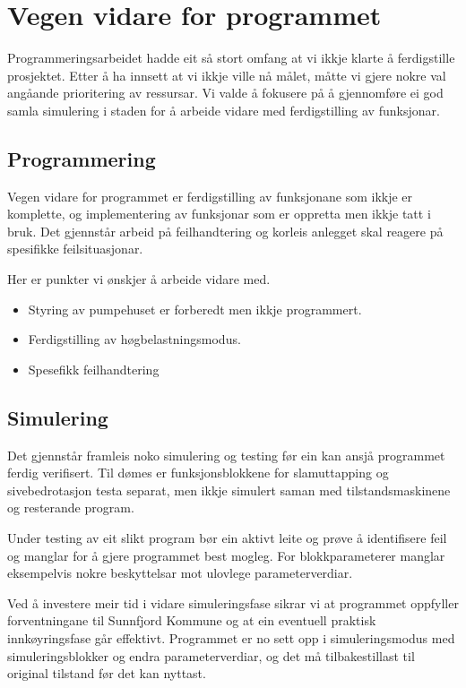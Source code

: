 \section{Vegen vidare for programmet}
\thispagestyle{fancy}

Programmeringsarbeidet hadde eit så stort omfang at vi ikkje klarte å ferdigstille prosjektet.
Etter å ha innsett at vi ikkje ville nå målet, måtte vi gjere nokre val angåande prioritering av ressursar. 
Vi valde å fokusere på å gjennomføre ei god samla simulering i staden for å arbeide vidare med ferdigstilling av funksjonar.

\subsection{Programmering}

Vegen vidare for programmet er ferdigstilling av funksjonane som ikkje er komplette, og 
implementering av funksjonar som er oppretta men ikkje tatt i bruk. 
Det gjennstår arbeid på feilhandtering og korleis anlegget skal reagere på spesifikke feilsituasjonar.

Her er punkter vi ønskjer å arbeide vidare med.

\begin{itemize}
    \item Styring av pumpehuset er forberedt men ikkje programmert. 
    \item Ferdigstilling av høgbelastningsmodus.
    \item Spesefikk feilhandtering
\end{itemize}

\subsection{Simulering}

Det gjennstår framleis noko simulering og testing før ein kan ansjå programmet ferdig verifisert.
Til dømes er funksjonsblokkene for slamuttapping og sivebedrotasjon testa separat, men ikkje simulert saman med
tilstandsmaskinene og resterande program.

Under testing av eit slikt program bør ein aktivt leite og prøve å identifisere feil og manglar for å gjere programmet best mogleg.
For blokkparameterer manglar eksempelvis nokre beskyttelsar mot ulovlege parameterverdiar.

Ved å investere meir tid i vidare simuleringsfase sikrar vi at programmet oppfyller forventningane til \gls{Sunnfjord Kommune} og at ein eventuell
praktisk innkøyringsfase går effektivt. \newline
Programmet er no sett opp i simuleringsmodus med simuleringsblokker og endra parameterverdiar, 
og det må tilbakestillast til original tilstand før det kan nyttast. 




\newpage